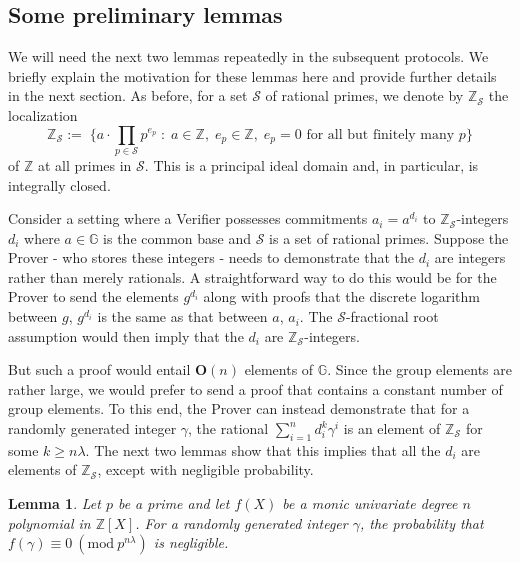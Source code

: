 \documentclass[11pt, lettersize, notitlepage, leqno, footskip=0.6cm]{article}
\newcommand{\bz}{\mathbb Z}
\newcommand{\pl}{\prod\limits}
\newcommand{\bG}{\mathbb{G}}
\newcommand{\mc}{\mathcal}
\newcommand{\mb}{\mathbb}
\newcommand{\mbf}{\mathbf}
\newcommand{\lam}{\lambda}
\newcommand{\bzs}{\bz_{\mc{S}}}
\newcommand{\bzS}{\bz_{\mc{S}}}
\newcommand{\bO}{\mbf{O}}
\newcommand{\vs}{\vspace{-0.15cm}}
\newcommand{\Mod}[1]{\ (\mathrm{mod}\ #1)}
\newtheorem{Lem}[Thm]{Lemma}
\numberwithin{equation}{section}
\begin{document}
\subsection{\fontsize{11}{11}\selectfont Some preliminary lemmas }

We will need the next two lemmas repeatedly in the subsequent protocols. We briefly explain the motivation for these lemmas here and provide further details in the next section. As before, for a set $\mc{S}$ of rational primes, we denote by $\bz_{\mc{S}}$ the localization \vs $$\bz_{\mc{S}}:= \;\Big\{a\cdot\pl_{p\in \mc{S}} p^{e_p}\;:\;a\in\bz,\; e_p\in \bz,\;e_p = 0 \text{ for all but finitely many } p\Big\}  $$ of $\bz$ at all primes in $\mc{S}$. This is a principal ideal domain and, in particular, is integrally closed. 

Consider a setting where a Verifier possesses commitments $a_i = a^{d_i} $ to $\bz_{\mc{S}}$-integers $d_i$ where $a\in\bG$ is the common base and $\mc{S}$ is a set of rational primes. Suppose the Prover - who stores these integers - needs to demonstrate that the $d_i$ are integers rather than merely rationals. A straightforward way to do this would be for the Prover to send the elements $g^{d_i}$ along with proofs that the discrete logarithm between $g$, $g^{d_i}$ is the same as that between $a$, $a_i$. The $\mc{S}$-fractional root assumption would then imply that the $d_i$ are $\bzs$-integers. 

But such a proof would entail $\bO(n)$ elements of $\mb{G}$. Since the group elements are rather large, we would prefer to send a proof that contains a constant number of group elements. To this end, the Prover can instead demonstrate that for a randomly generated integer $\gamma$, the rational $\sum_{i=1}^n d_i^{k}\gamma^i$ is an element of $\bzS$ for some $k \geq n\lam$. The next two lemmas show that this implies that all the $d_i$ are elements of $\bzs$, except with negligible probability. 


\begin{Lem}\label{ram} Let $p$ be a prime and let $f(X)$ be a monic univariate degree $n$ polynomial in $\bz[X]$. For a randomly generated integer $\gamma$, the probability that $f(\gamma)\equiv 0\Mod{p^{n\lam}}$ is negligible. \end{Lem}
\end{document}
